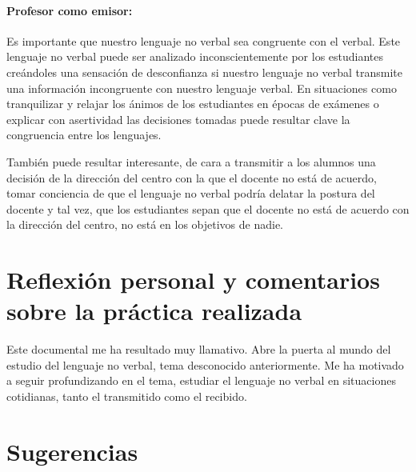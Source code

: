 \documentclass[palatino,nochap]{apuntesURJC}
\begin{document}
\paragraph{Profesor como emisor:}
%
Es importante que nuestro lenguaje no verbal sea congruente con el verbal.
%
Este lenguaje no verbal puede ser analizado inconscientemente por los estudiantes creándoles una sensación de desconfianza si nuestro lenguaje no verbal transmite una información incongruente con nuestro lenguaje verbal.
%
En situaciones como tranquilizar y relajar los ánimos de los estudiantes en épocas de exámenes o explicar con asertividad las decisiones tomadas puede resultar clave la congruencia entre los lenguajes.

También puede resultar interesante, de cara a transmitir a los alumnos una decisión de la dirección del centro con la que el docente no está de acuerdo, tomar conciencia de que el lenguaje no verbal podría delatar la postura del docente y tal vez, que los estudiantes sepan que el docente no está de acuerdo con la dirección del centro, no está en los objetivos de nadie.



\section{Reflexión personal y comentarios sobre la práctica realizada}

Este documental me ha resultado muy llamativo. 
%
Abre la puerta al mundo del estudio del lenguaje no verbal, tema desconocido anteriormente.
%
Me ha motivado a seguir profundizando en el tema, estudiar el lenguaje no verbal en situaciones cotidianas, tanto el transmitido como el recibido.

\section{Sugerencias}



%
%  

\printindex
\end{document}
